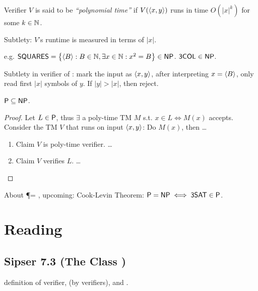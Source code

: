 \documentclass{article}
\begin{document}
\begin{definition}
  Verifier \(V\) is said to be {\it ``polynomial time''} if \(V(\encoding{x, y})\) runs in time \(O(|x|^k)\) for some \(k \in \N\).
\end{definition}

\begin{remark}
  Subtlety: \(V\)'s runtime is measured in terms of \(|x|\).
\end{remark}


e.g. \( \prob{SQUARES} = \setof{\encoding{B} : B \in \N, \exists x \in \N: x^2 = B } \in \NP \). \( \prob{3COL} \in \NP \).

Subtlety in verifier of : mark the input as \(\encoding{x, y}\), after interpreting \(x = \encoding{B}\), only read first \(|x|\) symbols of \(y\). If \(|y| > |x|\), then reject.

\begin{theorem}
  \( \P \subseteq \NP \).
\end{theorem}

\begin{proof}
  Let \(L \in \P\), thus \(\exists\) a poly-time TM \(M\) s.t. \(x \in L \iff M(x) \) accepts.
  Consider the TM \(V\) that runs on input \(\encoding{x, y}\): Do \(M(x)\), then \ldots
  \begin{enumerate}
    \item Claim \(V\) is poly-time verifier. \ldots
    \item Claim \(V\) verifies \(L\). \ldots
  \end{enumerate}
\end{proof}

About \P = \NP, upcoming: Cook-Levin Theorem: \( \P = \NP \iff \prob{3SAT} \in \P \).

\section{Reading}

\subsection{Sipser 7.3 (The Class \NP)}

definition of verifier, \NP (by verifiers), and \NTIME.
\end{document}
